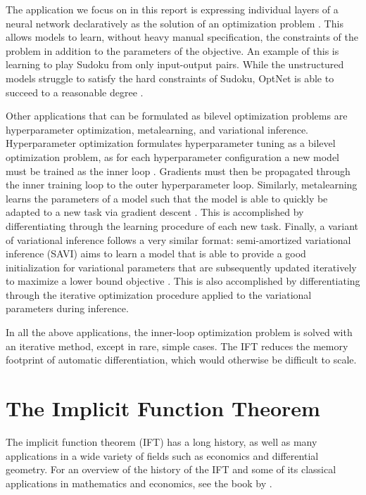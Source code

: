 \documentclass[11pt]{article}
\begin{document}
The application we focus on in this report is expressing individual layers of a neural network declaratively
as the solution of an optimization problem \citep{optnet,agrawal2019diffcvx,gould2019declarative}.
This allows models to learn, without heavy manual specification, the constraints of the problem
in addition to the parameters of the objective.
An example of this is learning to play Sudoku from only input-output pairs.
While the unstructured models struggle to satisfy the hard constraints of Sudoku,
OptNet is able to succeed to a reasonable degree \citep{optnet}.

Other applications that can be formulated as bilevel optimization problems are
hyperparameter optimization, metalearning, and variational inference.
Hyperparameter optimization formulates hyperparameter tuning as a bilevel optimization problem,
as for each hyperparameter configuration a new model must be trained as the inner loop
\citep{maclaurin2015reversible,lorraine2019implasso,lorraine2019hoift,bertrand2020implicit}.
Gradients must then be propagated through the inner training loop to the outer hyperparameter
loop.
Similarly, metalearning learns the parameters of a model such that the model is able to quickly
be adapted to a new task via gradient descent \citep{finn2017maml,rajeswaran2019imaml}.
This is accomplished by differentiating through the learning procedure of each new task.
Finally, a variant of variational inference follows a very similar format:
semi-amortized variational inference (SAVI) aims to learn a model that is able to provide
a good initialization for variational parameters that are subsequently updated iteratively
to maximize a lower bound objective \citep{kim2018savi}.
This is also accomplished by differentiating through the iterative optimization procedure
applied to the variational parameters during inference.

In all the above applications, the inner-loop optimization problem is solved
with an iterative method, except in rare, simple cases.
The IFT reduces the memory footprint of automatic differentiation,
which would otherwise be difficult to scale.

\section{The Implicit Function Theorem}
The implicit function theorem (IFT) has a long history, as well as many applications
in a wide variety of fields such as economics and differential geometry.
For an overview of the history of the IFT and some of its classical applications
in mathematics and economics,
see the book by \citet{iftbook}.
\end{document}
